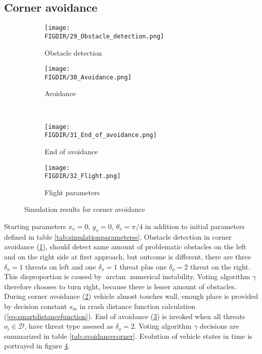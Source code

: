 \subsection{Corner avoidance} 
\begin{figure}[H]
    \begin{subfigure}{0.5\textwidth}
    \texttt{[image: \\FIGDIR/29\_Obstacle\_detection.png]} 
    \caption{Obstacle detection}
    \label{fig:29Obstacledetection}
    \end{subfigure}
    \begin{subfigure}{0.5\textwidth}
    \texttt{[image: \\FIGDIR/30\_Avoidance.png]}
    \caption{Avoidance}
    \label{fig:30Avoidance}
    \end{subfigure}
    \\
    \begin{subfigure}{0.5\textwidth}
    \texttt{[image: \\FIGDIR/31\_End\_of\_avoidance.png]} 
    \caption{End of avoidance}
    \label{fig:31Endofavoidance}
    \end{subfigure}
    \begin{subfigure}{0.5\textwidth}
    \texttt{[image: \\FIGDIR/32\_Flight.png]}
    \caption{Flight parameters}
    \label{fig:32Flightparameters}
    \end{subfigure}
\caption{Simulation results for corner avoidance}
\label{fig:SimulationCorner}
\end{figure}

Starting parameters $x_v = 0$, $y_v = 0$, $\theta_v = \pi/4$ in addition to initial parameters defined in table \ref{tab:simulationparameterss}. Obstacle detection in corner avoidance (\ref{fig:29Obstacledetection}), should detect same amount of problematic obstacles on the left and on the right side at first approach, but outcome is different, there are three $\delta_o=1$ threats on left and one $\delta_o=1$ threat plus one $\delta_o=2$ threat on the right. This disproportion is caused by $\arctan$ numerical instability. Voting algorithm $\gamma$ therefore chooses to turn right, because there is lesser amount of obstacles. During corner avoidance (\ref{fig:30Avoidance}) vehicle almost touches wall, enough place is provided by decision constant $s_m$ in crash distance function calculation (\ref{eq:smartdistancefunction}). End of avoidance (\ref{fig:31Endofavoidance}) is invoked when all threats $o_i\in\mathscr{D}$, have threat type assesed as $\delta_o=2$. Voting algorithm $\gamma$ decisions are summarized in table \ref{tab:avoidancecorner}. Evolution of vehicle states in time is portrayed in figure \ref{fig:32Flightparameters}.

